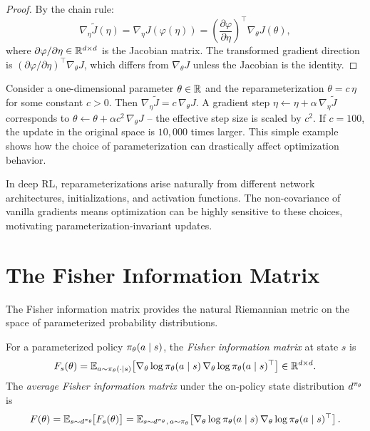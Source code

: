 \documentclass[11pt,a4paper]{article}
\begin{document}
\begin{proof}
By the chain rule:
\[
  \nabla_\eta \tilde{J}(\eta) = \nabla_\eta J(\varphi(\eta))
  = \left(\frac{\partial \varphi}{\partial \eta}\right)^\top \nabla_\theta J(\theta),
\]
where $\partial\varphi/\partial\eta \in \mathbb{R}^{d \times d}$ is the Jacobian
matrix. The transformed gradient direction is
$(\partial\varphi/\partial\eta)^\top \nabla_\theta J$, which differs from
$\nabla_\theta J$ unless the Jacobian is the identity.
\end{proof}

\begin{example}
\label{ex:scaling}
Consider a one-dimensional parameter $\theta \in \mathbb{R}$ and the
reparameterization $\theta = c\,\eta$ for some constant $c > 0$. Then
$\nabla_\eta \tilde{J} = c\, \nabla_\theta J$. A gradient step
$\eta \leftarrow \eta + \alpha\, \nabla_\eta \tilde{J}$ corresponds to
$\theta \leftarrow \theta + \alpha c^2\, \nabla_\theta J$ -- the
effective step size is scaled by $c^2$. If $c = 100$, the update in the
original space is $10{,}000$ times larger. This simple example shows how
the choice of parameterization can drastically affect optimization
behavior.
\end{example}

\begin{rlconnection}
In deep RL, reparameterizations arise naturally from different network
architectures, initializations, and activation functions. The
non-covariance of vanilla gradients means optimization can be highly
sensitive to these choices, motivating parameterization-invariant updates.
\end{rlconnection}

\section{The Fisher Information Matrix}

The Fisher information matrix provides the natural Riemannian metric on
the space of parameterized probability distributions.

\begin{definition}
\label{def:fisher}
For a parameterized policy $\pi_\theta(a \mid s)$, the
\emph{Fisher information matrix} at state $s$ is
\[
  F_s(\theta) = \mathbb{E}_{a \sim \pi_\theta(\cdot \mid s)}\!\left[
    \nabla_\theta \log \pi_\theta(a \mid s)\,
    \nabla_\theta \log \pi_\theta(a \mid s)^\top
  \right] \in \mathbb{R}^{d \times d}.
\]
The \emph{average Fisher information matrix} under the on-policy state
distribution $d^{\pi_\theta}$ is
\[
  F(\theta) = \mathbb{E}_{s \sim d^{\pi_\theta}}\!\bigl[F_s(\theta)\bigr]
  = \mathbb{E}_{s \sim d^{\pi_\theta},\, a \sim \pi_\theta}\!\left[
    \nabla_\theta \log \pi_\theta(a \mid s)\,
    \nabla_\theta \log \pi_\theta(a \mid s)^\top
  \right].
\]
\end{definition}
\end{document}
